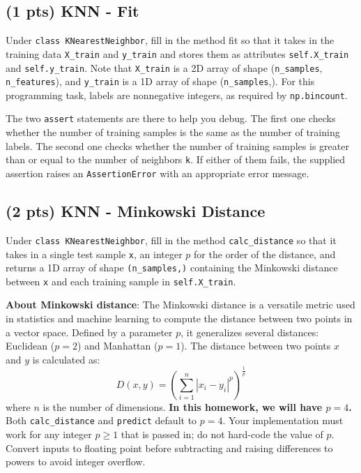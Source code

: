 \documentclass{article}
\begin{document}
\subsection{(1 pts) KNN - Fit}
Under \verb|class KNearestNeighbor|, fill in the method fit so that it takes in the training data \verb|X_train| and
\verb|y_train| and stores them as attributes \verb|self.X_train| and \verb|self.y_train|. Note that \verb|X_train| is a 2D array of
shape (\verb|n_samples|, \verb|n_features|), and \verb|y_train| is a 1D array of shape (\verb|n_samples|,). For this programming task, labels are nonnegative integers, as required by \verb|np.bincount|.

The two \verb|assert| statements are there to help you debug. The first one checks whether the number of
training samples is the same as the number of training labels. The second one checks whether the
number of training samples is greater than or equal to the number of neighbors \verb|k|. If either of them
fails, the supplied assertion raises an \verb|AssertionError| with an appropriate error message.

\subsection{(2 pts) KNN - Minkowski Distance}
Under \verb|class KNearestNeighbor|, fill in the method \verb|calc_distance| so that it takes in a single test sample \verb|x|, an integer $p$ for the order of the distance,
and returns a 1D array of shape \verb|(n_samples,)| containing the Minkowski distance between \verb|x| and each
training sample in \verb|self.X_train|.


\textbf{About Minkowski distance}: The Minkowski distance is a versatile metric used in statistics and machine learning to compute the distance between two points in a vector space. Defined by a parameter \( p \), it generalizes several distances: Euclidean (\( p=2 \)) and Manhattan (\( p=1 \)). The distance between two points \( x \) and \( y \) is calculated as:
\begin{equation}
D(x, y) = \left( \sum_{i=1}^n |x_i - y_i|^p \right)^{\frac{1}{p}}
\end{equation}
where \( n \) is the number of dimensions. \textbf{In this homework, we will have $p=4$.} Both \verb|calc_distance| and \verb|predict| default to $p=4$. Your implementation must work for any integer $p \geq 1$ that is passed in; do not hard-code the value of $p$. Convert inputs to floating point before subtracting and raising differences to powers to avoid integer overflow.
\end{document}
